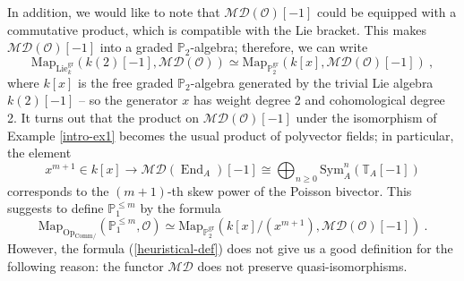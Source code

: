 \documentclass[10pt, oneside]{amsart}
\theoremstyle{plain}
\newcommand{\comm}{\mathrm{Comm}}
\DeclareMathOperator{\en}{End}
\newcommand{\lie}{\mathrm{Lie}}
\newcommand{\map}{\mathrm{Map}}
\renewcommand{\O}{\mathcal{O}}
\newcommand{\op}{\mathrm{Op}}
\newcommand{\PP}{\mathbb{P}}
\newcommand{\sym}{\mathrm{Sym}}
\newcommand{\TT}{\mathbb{T}}
\begin{document}
In addition, we would like to note that $\mathcal{MD}(\O)[-1]$ could be equipped with a commutative product, which is 
compatible with the Lie bracket. This makes $\mathcal{MD}(\O)[-1]$ into a graded $\PP_2$-algebra; therefore, we can write
\begin{equation*}
\map_{\lie_k^\mathrm{gr}} (k(2)[-1], \mathcal{MD}(\O)) \simeq \map_{\PP_2^\mathrm{gr}} (k[x], \mathcal{MD}(\O)[-1]) \:,
\end{equation*}
where $k[x]$ is the free graded $\PP_2$-algebra generated by the trivial Lie algebra $k(2)[-1]$ -- so the generator $x$ has weight 
degree 2
and cohomological degree 2. It turns out that the product on $\mathcal{MD}(\O)[-1]$ under the isomorphism of Example \ref{intro-ex1}
becomes the usual product of polyvector fields; in particular, the element
\begin{equation*}
x^{m+1} \in k[x] \longrightarrow \mathcal{MD}(\en_A)[-1] \cong \bigoplus_{n \ge 0} \sym_A^n (\TT_A[-1])
\end{equation*}
corresponds to the $(m+1)$-th skew power of the Poisson bivector.
This suggests to define $\PP_1^{\le m}$ by the formula
\begin{equation}\label{heuristical-def}
\map_{\op_{\comm/}} (\PP_1^{\le m}, \O) \simeq \map_{\PP_2^\mathrm{gr}} (k[x]/(x^{m+1}), \mathcal{MD}(\O)[-1]) \:.
\end{equation}
However, the formula (\ref{heuristical-def}) does not give us a good definition for the following reason: the functor $\mathcal{MD}$
does not  preserve quasi-isomorphisms.
\end{document}
